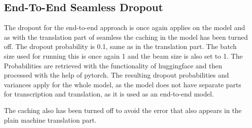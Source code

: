 \subsection{End-To-End Seamless Dropout}
The dropout for the end-to-end approach is once again applies on the model and as with the translation part of seamless the caching in the model has been turned off. 
The dropout probability is 0.1, same as in the translation part. 
The batch size used for running this is once again 1 and the beam size is also set to 1. 
The Probabilities are retrieved with the functionality of huggingface and then processed with the help of pytorch.
The resulting dropout probabilities and variances apply for the whole model, as the model does not have separate parts for transcription and translation, as it is used as an end-to-end model. 


The caching also has been turned off to avoid the error that also appears in the plain machine translation part. 
